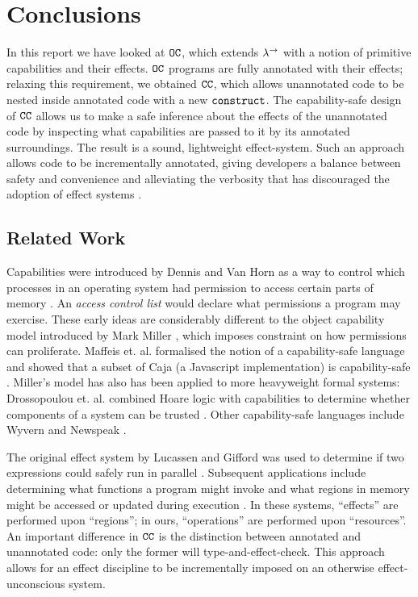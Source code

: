 
\chapter{Conclusions}

In this report we have looked at $\mathtt{OC}$, which extends $\lambda^{\rightarrow}$ with a notion of primitive capabilities and their effects. $\mathtt{OC}$ programs are fully annotated with their effects; relaxing this requirement, we obtained $\mathtt{CC}$, which allows unannotated code to be nested inside annotated code with a new $\mathtt{construct}$. The capability-safe design of $\mathtt{CC}$ allows us to make a safe inference about the effects of the unannotated code by inspecting what capabilities are passed to it by its annotated surroundings. The result is a sound, lightweight effect-system. Such an approach allows code to be incrementally annotated, giving developers a balance between safety and convenience and alleviating the verbosity that has discouraged the adoption of effect systems \cite{rytz2012}.

\section{Related Work}

Capabilities were introduced by Dennis and Van Horn as a way to control which processes in an operating system had permission to access certain parts of memory \cite{dennis66}. An \textit{access control list} would declare what permissions a program may exercise. These early ideas are considerably different to the object capability model introduced by Mark Miller \cite{miller06}, which imposes constraint on how permissions can proliferate. Maffeis et. al. formalised the notion of a capability-safe language and showed that a subset of Caja (a Javascript implementation) is capability-safe \cite{maffeis10}. Miller's model has also has been applied to more heavyweight formal systems: Drossopoulou et. al. combined Hoare logic with capabilities to determine whether components of a system can be trusted \cite{drossopoulou07}. Other capability-safe languages include Wyvern \cite{nistor13} and Newspeak \cite{bracha10}.

The original effect system by Lucassen and Gifford was used to determine if two expressions could safely run in parallel \cite{lucassen88}. Subsequent applications include determining what functions a program might invoke \cite{tang94} and what regions in memory might be accessed or updated during execution \cite{talpin94}. In these systems, ``effects'' are performed upon ``regions''; in ours, ``operations'' are performed upon ``resources''. An important difference in $\mathtt{CC}$ is the distinction between annotated and unannotated code: only the former will type-and-effect-check. This approach allows for an effect discipline to be incrementally imposed on an otherwise effect-unconscious system.

